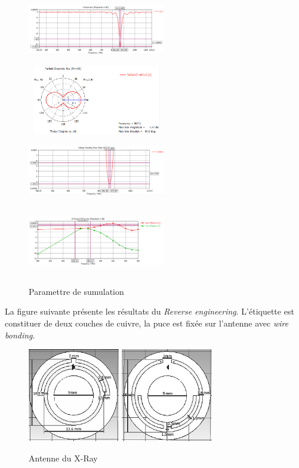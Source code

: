 \documentclass[11pt, a4paper, twoside]{book}
\begin{document}
\begin{figure}[H]
\centering
\includegraphics[width=6cm,height=3cm]{claaaass11}
\includegraphics[width=6cm,height=3cm]{claPattern}
\includegraphics[width=6cm,height=3cm]{claaavswr}
\includegraphics[width=6cm,height=3cm]{clawefficency}
\caption{Paramettre de sumulation}
\end{figure} 

La figure suivante présente les résultats du \emph{Reverse engineering}. L’étiquette est constituer de deux couches de cuivre, la puce est fixée sur l'antenne  avec \emph{wire bonding}. \\

\begin{figure}[H]
\centering
\includegraphics[width=4cm]{front11}
\includegraphics[width=4cm]{back22}
\caption{Antenne du X-Ray}
\end{figure}
\end{document}
